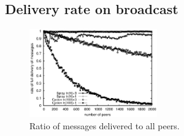
\subsection{Delivery rate on broadcast}

\begin{figure}
  \begin{center}
    \includegraphics[width=0.49\textwidth]{img/hardrate.eps}
    \caption{\label{fig:hardrate}Ratio of messages delivered to all peers.}
  \end{center}
\end{figure}

